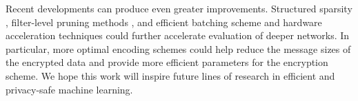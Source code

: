 \documentclass[conference]{IEEEtran}
\begin{document}

Recent developments can produce even greater improvements.
Structured sparsity \cite{wen2016learning}, filter-level pruning methods \cite{luo2017thinet}, and efficient batching scheme and hardware acceleration techniques \cite{Migliore:2017:HAH:3145508.3126558} could further accelerate evaluation of deeper networks. 
In particular, more optimal encoding schemes could help reduce the message sizes of the encrypted data and provide more efficient parameters for the encryption scheme.
We hope this work will inspire future lines of research in efficient and privacy-safe machine learning.



\end{document}
